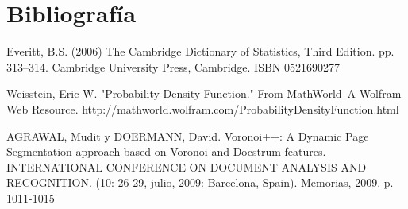 \documentclass[a4paper, 11pt, oneside]{report}
\begin{document}

\chapter*{Bibliografía}

Everitt, B.S. (2006) The Cambridge Dictionary of Statistics, Third Edition. pp. 313–314. Cambridge University Press, Cambridge. ISBN 0521690277

Weisstein, Eric W. "Probability Density Function." From MathWorld--A Wolfram Web Resource. http://mathworld.wolfram.com/ProbabilityDensityFunction.html

AGRAWAL, Mudit y DOERMANN, David. Voronoi++: A Dynamic Page Segmentation approach based on Voronoi and Docstrum features. INTERNATIONAL CONFERENCE ON DOCUMENT ANALYSIS AND RECOGNITION. (10: 26-29, julio, 2009: Barcelona, Spain). Memorias, 2009. p. 1011-1015
	
\end{document}
